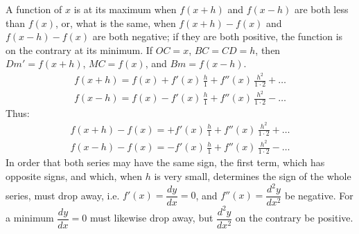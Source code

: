 \documentclass[12pt]{book}
\begin{document}
\begin{center}
\end{center}

A function of $x$ is at its maximum when $f(x + h)$ and $f(x - h)$ are both less than
$f(x)$, or, what is the same, when $f(x + h) - f(x)$ and $f(x - h) - f(x)$ are both
negative; if they are both positive, the function is on the contrary at its minimum.
If $OC = x$, $BC = CD = h$, then $Dm' = f(x+h)$, $MC = f(x)$, and $Bm = f(x - h)$.
\begin{gather*}
f(x + h) = f(x) + f'(x)\,\frac{h}{1} + f''(x)\,\frac{h^{2}}{1\cdot2} + \dots\\
f(x - h) = f(x) - f'(x)\,\frac{h}{1} + f''(x)\,\frac{h^{2}}{1\cdot2} - \dots
\end{gather*}
Thus:
\begin{gather*}
f(x+h) - f(x) = +f'(x)\,\frac{h}{1} + f''(x)\,\frac{h^{2}}{1\cdot2} + \dots\\
f(x-h) - f(x) = -f'(x)\,\frac{h}{1} + f''(x)\,\frac{h^{2}}{1\cdot2} - \dots
\end{gather*}
In order that both series may have the same sign, the first term, which has opposite
signs, and which, when $h$ is very small, determines the sign of the whole series,
must drop away, i.e. $f'(x) = \dfrac{dy}{dx} = 0$, and
$f''(x) = \dfrac{d^{2}y}{dx^{2}}$ be negative. For a minimum $\dfrac{dy}{dx} = 0$
must likewise drop away, but $\dfrac{d^{2}y}{dx^{2}}$ on the contrary be positive.
\end{document}

